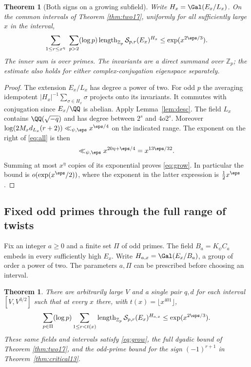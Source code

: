 \documentclass[a4paper,11pt]{article}
\newtheorem{theorem}[proposition]{Theorem}
\theoremstyle{definition}
\theoremstyle{remark}
\newcommand{\ZZ}{\mathbb Z}\newcommand{\ord}{\operatorname{ord}}
\newcommand{\len}{\operatorname{length}}\newcommand{\Res}{\operatorname*{Res}}
\numberwithin{equation}{section}
\newcommand{\Sel}{\mathcal S}
\begin{document}
\begin{theorem}[Both signs on a growing subfield]\label{thm:growing}
Write \(H_x=\Gal(E_x/L_x)\). On the common intervals of Theorem \ref{thm:two17}, uniformly for all sufficiently large \(x\) in the interval,
\begin{equation}
 \sum_{1\le r\le x^\eta}\ \sum_{p>2}(\log p)
              \len_{\ZZ_p}\Sel_{p,r}(E_x)^{H_x}
       \le \exp(x^{2\eps/3}).
 \label{eq:grow}
\end{equation}
The inner sum is over primes. The invariants are a direct summand over \(\ZZ_p\); the estimate also holds for either complex-conjugation eigenspace separately.
\end{theorem}
\begin{proof}
The extension \(E_x/L_x\) has degree a power of two. For odd \(p\) the averaging idempotent \(|H_x|^{-1}\sum_{\sigma\in H_x}\sigma\) projects onto its invariants. It commutes with conjugation since \(E_x/\QQ\) is abelian. Apply Lemma~\ref{lem:desc}. The field \(L_x\) contains \(\QQ(\sqrt{-q})\) and has degree between \(2^s\) and \(4o2^s\). Moreover \(\log(2M_x d_{L_x}(r+2))\ll_{\psi,\eps}x^{\eps/4}\) on the indicated range. The exponent on the right of \eqref{eq:all} is then
\[
 \ll_{\psi,\eps} x^{20\eta+\eps/4}=x^{13\eps/32}.
\]
Summing at most \(x^\eta\) copies of its exponential proves \eqref{eq:grow}. In particular the bound is \(o(\exp(x^\eps/2))\), where the exponent in the latter expression is \(\tfrac12x^\eps\).
\end{proof}

\subsection{Fixed odd primes through the full range of twists}\label{nav:II-15}
Fix an integer \(a\ge0\) and a finite set \(\Pi\) of odd primes. The field \(B_a=K_\psi C_a\) embeds in every sufficiently high \(E_x\). Write \(H_{a,x}=\Gal(E_x/B_a)\), a group of order a power of two. The parameters \(a,\Pi\) can be prescribed before choosing an interval.

\begin{theorem}\label{thm:fixed}
There are arbitrarily large \(V\) and a single pair \(q,d\) for each interval \([V,V^{3/2}]\) such that at every \(x\) there, with \(t(x)=\lfloor x^{401}\rfloor\),
\begin{equation}
 \sum_{p\in\Pi}(\log p)\sum_{1\le r<t(x)}
       \len_{\ZZ_p}\Sel_{p,r}(E_x)^{H_{a,x}}
       \le \exp(x^{2\eps/3}).
 \label{eq:fixed}
\end{equation}
These same fields and intervals satisfy \eqref{eq:grow}, the full dyadic bound of Theorem \ref{thm:two17}, and the odd-prime bound for the sign \((-1)^{r+1}\) in Theorem~\ref{thm:critical13}.
\end{theorem}
\end{document}
